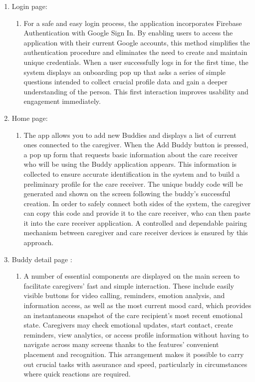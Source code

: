 \begin{enumerate}[leftmargin=2.2cm]
	\item Login page:
	\begin{enumerate}[label=\alph*.] 
		\item For a safe and easy login process, the application incorporates Firebase Authentication with Google Sign In. By enabling users to access the application with their current Google accounts, this method simplifies the authentication procedure and eliminates the need to create and maintain unique credentials. When a user successfully logs in for the first time, the system displays an onboarding pop up that asks a series of simple questions intended to collect crucial profile data and gain a deeper understanding of the person. This first interaction improves usability and engagement immediately.
	\end{enumerate}
	
	\item Home page:
	\begin{enumerate}[label=\alph*.] 
		\item The app allows you to add new Buddies and displays a list of current ones connected to the caregiver. When the Add Buddy button is pressed, a pop up form that requests basic information about the care receiver who will be using the Buddy application appears. This information is collected to ensure accurate identification in the system and to build a preliminary profile for the care receiver. The unique buddy code will be generated and shown on the screen following the buddy's successful creation. In order to safely connect both sides of the system, the caregiver can copy this code and provide it to the care receiver, who can then paste it into the care receiver application. A controlled and dependable pairing mechanism between caregiver and care receiver devices is ensured by this approach.
	\end{enumerate}
	
	\item Buddy detail page :
	\begin{enumerate}[label=\alph*.] 
		\item A number of essential components are displayed on the main screen to facilitate caregivers' fast and simple interaction. These include easily visible buttons for video calling, reminders, emotion analysis, and information access, as well as the most current mood card, which provides an instantaneous snapshot of the care recipient's most recent emotional state. Caregivers may check emotional updates, start contact, create reminders, view analytics, or access profile information without having to navigate across many screens thanks to the features' convenient placement and recognition. This arrangement makes it possible to carry out crucial tasks with assurance and speed, particularly in circumstances where quick reactions are required.
	\end{enumerate}
	

\end{enumerate}
